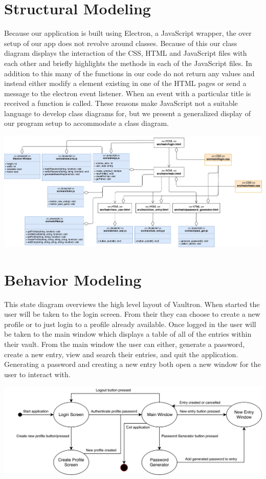 \documentclass[11pt]{report}
\begin{document}
\section{Structural Modeling}
Because our application is built using Electron, a JavaScript wrapper, 
the over setup of our app does not revolve around classes. Because of this
our class diagram displays the interaction of the CSS, HTML and JavaScript 
files with each other and briefly highlights the methods in each of the 
JavaScript files. In addition to this many of the functions in our code do
not return any values and instead either modify a element existing in one of
the HTML pages or send a message to the electron event listener. When an 
event with a particular title is received a function is called. These reasons
make JavaScript not a suitable language to develop class diagrams for, but
we present a generalized display of our program setup to accommodate a class
diagram.


\includegraphics[scale=.1]{class_diagram.png}

\section{Behavior Modeling}
This state diagram overviews the high level layout of Vaultron. When started the user will be taken to the login screen. From their they can choose to create a new profile or to just login to a profile already available. Once logged in the user will be taken to the main window which displays a table of all of the entries within their vault. From the main window the user can either, generate a password, create a new entry, view and search their entries, and quit the application. Generating a password and creating a new entry both open a new window for the user to interact with. 

\includegraphics[scale=.1]{state_diagram.png}
\end{document}
